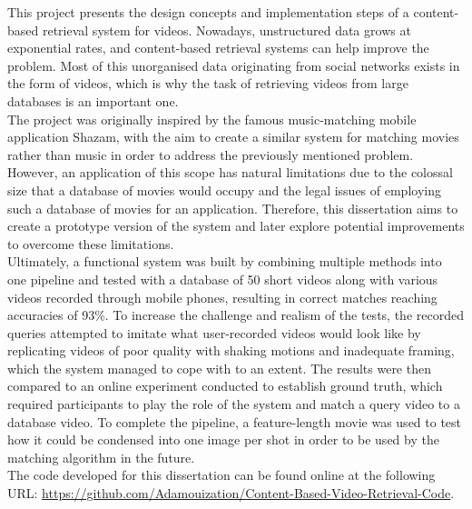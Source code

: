 This project presents the design concepts and implementation steps of a content-based retrieval system for videos. Nowadays, unstructured data grows at exponential rates, and content-based retrieval systems can help improve the problem. Most of this unorganised data originating from social networks exists in the form of videos, which is why the task of retrieving videos from large databases is an important one.\\

The project was originally inspired by the famous music-matching mobile application Shazam, with the aim to create a similar system for matching movies rather than music in order to address the previously mentioned problem. However, an application of this scope has natural limitations due to the colossal size that a database of movies would occupy and the legal issues of employing such a database of movies for an application. Therefore, this dissertation aims to create a prototype version of the system and later explore potential improvements to overcome these limitations.\\

Ultimately, a functional system was built by combining multiple methods into one pipeline and tested with a database of 50 short videos along with various videos recorded through mobile phones, resulting in correct matches reaching accuracies of 93\%. To increase the challenge and realism of the tests, the recorded queries attempted to imitate what user-recorded videos would look like by replicating videos of poor quality with shaking motions and inadequate framing, which the system managed to cope with to an extent. The results were then compared to an online experiment conducted to establish ground truth, which required participants to play the role of the system and match a query video to a database video. To complete the pipeline, a feature-length movie was used to test how it could be condensed into one image per shot in order to be used by the matching algorithm in the future.\\

The code developed for this dissertation can be found online at the following URL: \url{https://github.com/Adamouization/Content-Based-Video-Retrieval-Code}.